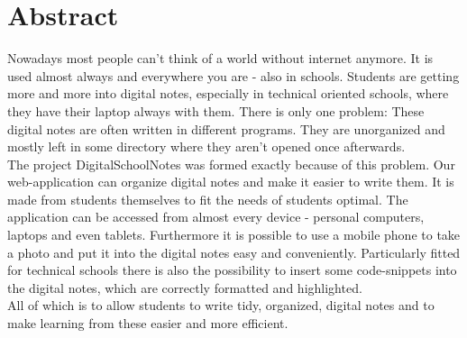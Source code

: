 \section*{Abstract}

Nowadays most people can't think of a world without internet anymore. It is used almost always and everywhere you are - also in schools. Students are getting more and more into digital notes, especially in technical oriented schools, where they have their laptop always with them. There is only one problem: These digital notes are often written in different programs. They are unorganized and mostly left in some directory where they aren't opened once afterwards.\\
The project DigitalSchoolNotes was formed exactly because of this problem. Our web-application can organize digital notes and make it easier to write them. It is made from students themselves to fit the needs of students optimal. The application can be accessed from almost every device - personal computers, laptops and even tablets. Furthermore it is possible to use a mobile phone to take a photo and put it into the digital notes easy and conveniently. Particularly fitted for technical schools there is also the possibility to insert some code-snippets into the digital notes, which are correctly formatted and highlighted.\\
All of which is to allow students to write tidy, organized, digital notes and to make learning from these easier and more efficient.